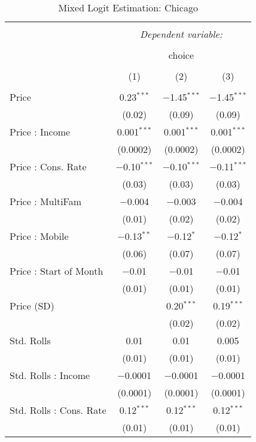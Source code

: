 
\begin{table}[!htbp] \centering 
  \caption{Mixed Logit Estimation: Chicago} 
  \label{tab:mnlChicagoRandCoef} 
\begin{tabular}{@{\extracolsep{5pt}}lccc} 
\\[-1.8ex]\hline 
\hline \\[-1.8ex] 
 & \multicolumn{3}{c}{\textit{Dependent variable:}} \\ 
\cline{2-4} 
\\[-1.8ex] & \multicolumn{3}{c}{choice} \\ 
\\[-1.8ex] & (1) & (2) & (3)\\ 
\hline \\[-1.8ex] 
 Price & 0.23$^{***}$ & $-$1.45$^{***}$ & $-$1.45$^{***}$ \\ 
  & (0.02) & (0.09) & (0.09) \\ 
  Price : Income & 0.001$^{***}$ & 0.001$^{***}$ & 0.001$^{***}$ \\ 
  & (0.0002) & (0.0002) & (0.0002) \\ 
  Price : Cons. Rate & $-$0.10$^{***}$ & $-$0.10$^{***}$ & $-$0.11$^{***}$ \\ 
  & (0.03) & (0.03) & (0.03) \\ 
  Price : MultiFam & $-$0.004 & $-$0.003 & $-$0.004 \\ 
  & (0.01) & (0.02) & (0.02) \\ 
  Price : Mobile & $-$0.13$^{**}$ & $-$0.12$^{*}$ & $-$0.12$^{*}$ \\ 
  & (0.06) & (0.07) & (0.07) \\ 
  Price : Start of Month & $-$0.01 & $-$0.01 & $-$0.01 \\ 
  & (0.01) & (0.01) & (0.01) \\ 
  Price (SD) &  & 0.20$^{***}$ & 0.19$^{***}$ \\ 
  &  & (0.02) & (0.02) \\ 
  Std. Rolls & 0.01 & 0.01 & 0.005 \\ 
  & (0.01) & (0.01) & (0.01) \\ 
  Std. Rolls : Income & $-$0.0001 & $-$0.0001 & $-$0.0001 \\ 
  & (0.0001) & (0.0001) & (0.0001) \\ 
  Std. Rolls : Cons. Rate & 0.12$^{***}$ & 0.12$^{***}$ & 0.12$^{***}$ \\ 
  & (0.01) & (0.01) & (0.01) \\ 

\end{tabular}
\end{table}
